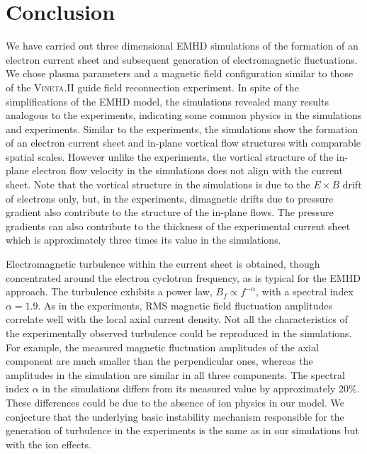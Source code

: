 \documentclass[aip,preprint]{revtex4-1}
\begin{document}
\section{Conclusion}
\label{sec:conclusion}
We have carried out three dimensional EMHD simulations of the formation of an electron current sheet and subsequent generation of electromagnetic fluctuations.
We chose plasma parameters and a magnetic field configuration similar to those of the \textsc{Vineta.II} guide field reconnection  experiment.
In spite of the simplifications of the EMHD model, the simulations revealed many results analogous to the experiments, indicating some common physics in the simulations and experiments. Similar to the experiments, the simulations show the formation of an electron current sheet and in-plane vortical flow structures with comparable spatial scales. 
However unlike the experiments, the vortical structure of the in-plane electron flow velocity in the simulations does not align with the current sheet. Note that the vortical structure in the simulations is due to the $E \times B$ drift of electrons only, but, in the experiments, dimagnetic drifts due to pressure gradient also contribute to the structure of the in-plane flows. The pressure gradients can also contribute to the thickness of the experimental current sheet which is approximately three times its value in the simulations. 

Electromagnetic turbulence within the current sheet is obtained, though concentrated around the electron cyclotron frequency, as is typical for the EMHD approach. The turbulence exhibits a power law, $B_f \propto f^{-\alpha}$,  with a spectral index $\alpha=1.9$. As in the experiments, RMS magnetic field fluctuation amplitudes correlate well with the local axial current density. 
Not all the characteristics of the experimentally observed turbulence could be reproduced in the simulations.  For example, 
the measured magnetic fluctuation amplitudes of the axial component are much smaller than the perpendicular ones, whereas the amplitudes in the simulation are similar in all three components. The spectral index $\alpha$ in the simulations differs from its measured value by approximately 20\%. These differences could be due to the absence of ion physics in our model.
We conjecture that the underlying basic instability mechanism responsible for the generation of turbulence in the experiments  is the same as in our simulations but with the ion effects.
\end{document}
